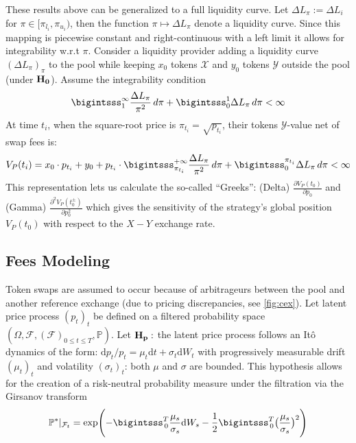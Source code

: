 \documentclass[11pt, letterpaper]{article}
\newcommand{\X}{\mathcal{X}}
\newcommand{\Y}{\mathcal{Y}}
\renewcommand{\d}{\textrm{d}}
\begin{document}
These results above can be generalized to a full liquidity curve. Let $\Delta L_\pi := \Delta L_i$ for $\pi\in[\pi_{l_i},\pi_{u_i})$, then the function $\pi\mapsto\Delta L_\pi$ denote a liquidity curve. Since this mapping is piecewise constant and right-continuous with a left limit it allows for integrability w.r.t $\pi$. Consider a liquidity provider adding a liquidity curve $(\Delta L_\pi)_\pi$ to the pool while keeping $x_0$ tokens $\X$ and $y_0$ tokens $\Y$ outside the pool (under $\bf{H}_0$). Assume the integrability condition 
\begin{equation}
\bigintsss_1^\infty \frac{\Delta L_\pi}{\pi^2}\,d\pi + \bigintsss_0^1 \Delta L_\pi\, d\pi < \infty
\end{equation}
At time $t_i$, when the square-root price is $\pi_{t_i}=\sqrt{p_{t_i}}$, their tokens $\Y$-value net of swap fees is:
\begin{equation}
\label{eq:strat_payoff}
V_P(t_i)= x_0\cdot p_{t_i} + y_0 + p_{t_i}\cdot\bigintsss_{\pi_{t_i}}^{+\infty} \frac{\Delta L_\pi}{\pi^2}\,d\pi + \bigintsss_0^{\pi_{t_i}} \Delta L_\pi\,d\pi < \infty
\end{equation}
This representation lets us calculate the so-called ``Greeks'': (Delta) $\frac{\partial V_P(t_0)}{\partial p_0}$ and (Gamma) $\frac{\partial^2 V_P(t_0^{\pm})}{\partial p_0^2}$ which gives the sensitivity of the strategy's global position $V_P(t_0)$ with respect to the $X-Y$ exchange rate. 

\subsection*{Fees Modeling}
Token swaps are assumed to occur because of arbitrageurs between the pool and another reference exchange (due to pricing discrepancies, see \cref{fig:cex}). 
Let latent price process $(p_t)_t$ be defined on a filtered probability space $(\Omega, \mathcal{F}, (\mathcal{F})_{0\leq t\leq T},\mathbb{P})$.
Let $\bf{H}_p:$ the latent price process follows an It\^o dynamics of the form: $\d p_t / p_t= \mu_t\d t + \sigma_t\d W_t$ with progressively measurable drift $(\mu_t)_t$ and volatility $(\sigma_t)_t$: both $\mu$ and $\sigma$ are bounded. 
This hypothesis allows for the creation of a risk-neutral probability measure under the filtration via the Girsanov transform
\begin{equation}
\label{eq:girsanov}
\mathbb{P}^*|_{\mathcal{F}_t}=\exp\Biggl(-\bigintsss_{\,0}^{T} \frac{\mu_s}{\sigma_s}\d W_s 
- \frac{1}{2}\bigintsss_{\, 0}^{T}\bigl(\frac{\mu_s}{\sigma_s}\bigr)^2\Biggr)
\end{equation}
\end{document}
